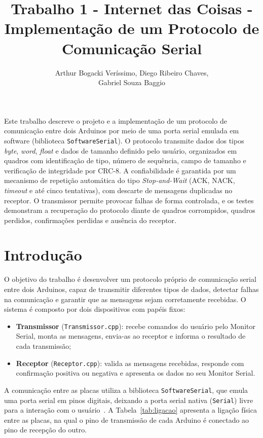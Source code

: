\documentclass[12pt]{article}
\title{Trabalho 1 - Internet das Coisas - Implementação de um Protocolo de Comunicação Serial}
\author{Arthur Bogacki Veríssimo\inst{1}, Diego Ribeiro Chaves\inst{1},\\
Gabriel Souza Baggio\inst{1}}
\begin{document}
\maketitle

\begin{resumo}
Este trabalho descreve o projeto e a implementação de um protocolo de comunicação entre dois Arduinos por meio de uma porta serial emulada em software (biblioteca \texttt{SoftwareSerial}). O protocolo transmite dados dos tipos \emph{byte}, \emph{word}, \emph{float} e dados de tamanho definido pelo usuário, organizados em quadros com identificação de tipo, número de sequência, campo de tamanho e verificação de integridade por CRC-8. A confiabilidade é garantida por um mecanismo de repetição automática do tipo \emph{Stop-and-Wait} (ACK, NACK, \emph{timeout} e até cinco tentativas), com descarte de mensagens duplicadas no receptor. O transmissor permite provocar falhas de forma controlada, e os testes demonstram a recuperação do protocolo diante de quadros corrompidos, quadros perdidos, confirmações perdidas e ausência do receptor.
\end{resumo}

\section{Introdução}

O objetivo do trabalho é desenvolver um protocolo próprio de comunicação serial entre dois Arduinos, capaz de transmitir diferentes tipos de dados, detectar falhas na comunicação e garantir que as mensagens sejam corretamente recebidas. O sistema é composto por dois dispositivos com papéis fixos:

\begin{itemize}
  \item \textbf{Transmissor} (\texttt{Transmissor.cpp}): recebe comandos do usuário pelo Monitor Serial, monta as mensagens, envia-as ao receptor e informa o resultado de cada transmissão;
  \item \textbf{Receptor} (\texttt{Receptor.cpp}): valida as mensagens recebidas, responde com confirmação positiva ou negativa e apresenta os dados no seu Monitor Serial.
\end{itemize}

A comunicação entre as placas utiliza a biblioteca \texttt{SoftwareSerial}, que emula uma porta serial em pinos digitais, deixando a porta serial nativa (\texttt{Serial}) livre para a interação com o usuário~\cite{arduino-softwareserial}. A Tabela~\ref{tab:ligacao} apresenta a ligação física entre as placas, na qual o pino de transmissão de cada Arduino é conectado ao pino de recepção do outro.
\end{document}
